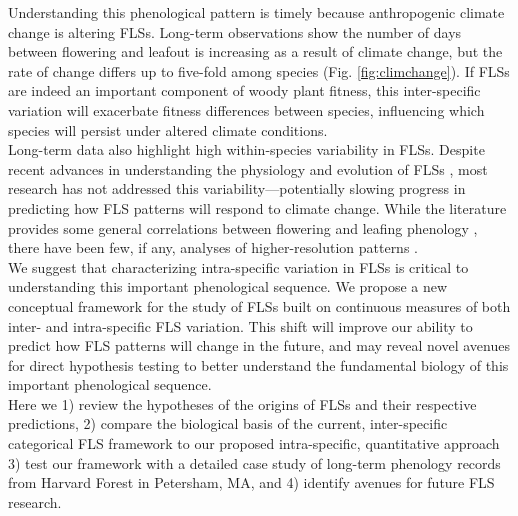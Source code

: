 \documentclass{article}
\begin{document}
\noindent Understanding this phenological pattern is timely because anthropogenic climate change is altering FLSs. Long-term observations show the number of days between flowering and leafout is increasing as a result of climate change, but the rate of change differs up to five-fold among species (Fig. \ref{fig:climchange}).  If FLSs are indeed an important component of woody plant fitness, this inter-specific variation will exacerbate fitness differences between species, influencing which species will persist under altered climate conditions.\\ %

\noindent Long-term data also highlight high within-species variability in FLSs. Despite recent advances in understanding the physiology and evolution of FLSs \citep{Gougherty2018,Savage2019}, most research has not addressed this variability---potentially slowing progress in predicting how FLS patterns will respond to climate change. While the literature provides some general correlations between flowering and leafing phenology \citep{Lechowicz_1995, Ettinger2018}, there have been few, if any, analyses of higher-resolution patterns \citep{Gougherty2018}. \\

We suggest that characterizing intra-specific variation in FLSs is critical to understanding this important phenological sequence. We propose a new conceptual framework for the study of FLSs built on continuous measures of both inter- and intra-specific FLS variation. This shift will improve our ability to predict how FLS patterns will change in the future, and  may reveal novel avenues for direct hypothesis testing to better understand the fundamental biology of this important phenological sequence.\\

\noindent Here we 1) review the hypotheses of the origins of FLSs and their respective predictions, 2) compare the biological basis of the current, inter-specific categorical FLS framework to our proposed intra-specific, quantitative approach 3) test our framework with a detailed case study of long-term phenology records from Harvard Forest in Petersham, MA, and 4) identify avenues for future FLS research.
\end{document}
